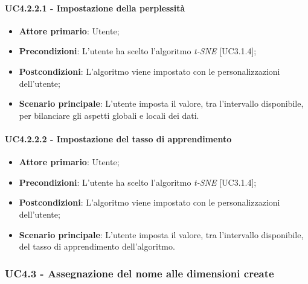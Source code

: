 	
\paragraph{UC4.2.2.1 - Impostazione della perplessità}
\begin{itemize}
	\item \textbf{Attore primario}: Utente;
	
	\item \textbf{Precondizioni}: L'utente ha scelto l'algoritmo \textit{t-SNE} [UC3.1.4];
	
	\item \textbf{Postcondizioni}: L'algoritmo viene impostato con le personalizzazioni dell'utente;
	
	\item \textbf{Scenario principale}: L'utente imposta il valore, tra l'intervallo disponibile, per bilanciare gli aspetti globali e locali dei dati.

\end{itemize}
	
\paragraph{UC4.2.2.2 - Impostazione del tasso di apprendimento}
\begin{itemize}
	\item \textbf{Attore primario}: Utente;
	
	\item \textbf{Precondizioni}: L'utente ha scelto l'algoritmo \textit{t-SNE} [UC3.1.4];
	
	\item \textbf{Postcondizioni}: L'algoritmo viene impostato con le personalizzazioni dell'utente;
	
	\item \textbf{Scenario principale}: L'utente imposta il valore, tra l'intervallo disponibile, del tasso di apprendimento dell'algoritmo.

\end{itemize}

\subsubsection{UC4.3 - Assegnazione del nome alle dimensioni create}


